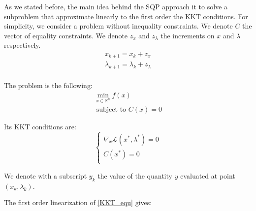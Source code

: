 As we stated before, the main idea behind the SQP approach it to solve a subproblem that approximate linearly to the first order the KKT conditions.
For simplicity, we consider a problem without inequality constraints.
We denote $C$ the vector of equality constraints.
We denote $z_x$ and $z_\lambda$ the increments on $x$ and $\lambda$ respectively.
\begin{equation}
  \begin{array}{l}
    x_{k+1} = x_k + z_x\\
    \lambda_{k+1} = \lambda_k+z_\lambda\\
  \end{array}
\end{equation}

The problem is the following:
\begin{equation}
  \begin{array}{l}
    \min\limits_{x\in\mathbb{R}^n}{f(x)} \\
    \text{ subject to } C(x) = 0
  \end{array}
\end{equation}

Its KKT conditions are:
\begin{equation}
  \label{KKT_equ}
  \left\{
\begin{array}{ll}
  \nabla_x\mathcal{L}(x^*,\lambda^*) = 0\\
  C(x^*) = 0\\
\end{array}
\right.
\end{equation}

We denote with a subscript $y_k$ the value of the quantity $y$ evaluated at point $(x_k, \lambda_k)$.

The first order linearization of \ref{KKT_equ} gives:

